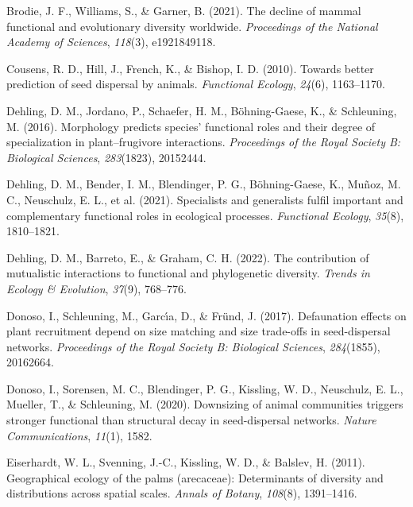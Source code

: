 \documentclass[
]{agujournal2019}
\newlength{\cslhangindent}
\newenvironment{CSLReferences}[2] %
 {\begin{list}{}{%
  \setlength{\itemindent}{0pt}
  \setlength{\leftmargin}{0pt}
  \setlength{\parsep}{0pt}
  \ifodd #1
   \setlength{\leftmargin}{\cslhangindent}
   \setlength{\itemindent}{-1\cslhangindent}
  \fi
  \setlength{\itemsep}{#2\baselineskip}}}
 {\end{list}}
\begin{document}
\begin{CSLReferences}{1}{0}
Brodie, J. F., Williams, S., \& Garner, B. (2021). The decline of mammal
functional and evolutionary diversity worldwide. \emph{Proceedings of
the National Academy of Sciences}, \emph{118}(3), e1921849118.

Cousens, R. D., Hill, J., French, K., \& Bishop, I. D. (2010). Towards
better prediction of seed dispersal by animals. \emph{Functional
Ecology}, \emph{24}(6), 1163--1170.

Dehling, D. M., Jordano, P., Schaefer, H. M., Böhning-Gaese, K., \&
Schleuning, M. (2016). Morphology predicts species' functional roles and
their degree of specialization in plant--frugivore interactions.
\emph{Proceedings of the Royal Society B: Biological Sciences},
\emph{283}(1823), 20152444.

Dehling, D. M., Bender, I. M., Blendinger, P. G., Böhning-Gaese, K.,
Muñoz, M. C., Neuschulz, E. L., et al. (2021). Specialists and
generalists fulfil important and complementary functional roles in
ecological processes. \emph{Functional Ecology}, \emph{35}(8),
1810--1821.

Dehling, D. M., Barreto, E., \& Graham, C. H. (2022). The contribution
of mutualistic interactions to functional and phylogenetic diversity.
\emph{Trends in Ecology \& Evolution}, \emph{37}(9), 768--776.

Donoso, I., Schleuning, M., Garcı́a, D., \& Fründ, J. (2017). Defaunation
effects on plant recruitment depend on size matching and size trade-offs
in seed-dispersal networks. \emph{Proceedings of the Royal Society B:
Biological Sciences}, \emph{284}(1855), 20162664.

Donoso, I., Sorensen, M. C., Blendinger, P. G., Kissling, W. D.,
Neuschulz, E. L., Mueller, T., \& Schleuning, M. (2020). Downsizing of
animal communities triggers stronger functional than structural decay in
seed-dispersal networks. \emph{Nature Communications}, \emph{11}(1),
1582.

Eiserhardt, W. L., Svenning, J.-C., Kissling, W. D., \& Balslev, H.
(2011). Geographical ecology of the palms (arecaceae): Determinants of
diversity and distributions across spatial scales. \emph{Annals of
Botany}, \emph{108}(8), 1391--1416.


\end{CSLReferences}
\end{document}
